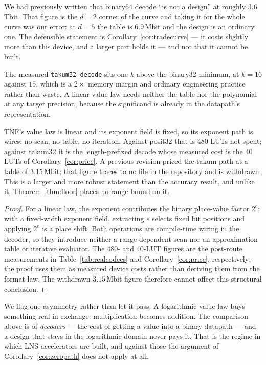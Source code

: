 We had previously written that binary64 decode ``is not a design'' at roughly
$3.6$\,Tbit. That figure is the $d = 2$ corner of the curve and taking it for the
whole curve was our error: at $d = 5$ the table is $6.9$\,Mbit and the design is an
ordinary one. The defensible statement is Corollary~\ref{cor:tradecurve} --- it
costs slightly more than this device, and a larger part holds it --- and not that it
cannot be built.

The measured \texttt{takum32\_decode} sits one $k$ above the binary32 minimum, at
$k = 16$ against $15$, which is a $2\times$ memory margin and ordinary engineering
practice rather than waste. A linear value law needs neither the table nor the
polynomial at any target precision, because the significand is already in the
datapath's representation.

\begin{corollary}
\label{cor:zeropath}
TNF's value law is linear and its exponent field is fixed, so its exponent path
is wires: no scan, no table, no iteration. Against posit32 that is $480$ LUTs not
spent; against takum32 it is the length-prefixed decode whose measured cost is the
$40$ LUTs of Corollary~\ref{cor:price}. A previous revision priced the takum path
at a table of $3.15$\,Mbit; that figure traces to no file in the repository and is
withdrawn. This is a
larger and more robust statement than the accuracy result, and unlike it,
Theorem~\ref{thm:floor} places no range bound on it.
\end{corollary}
\begin{proof}
For a linear law, the exponent contributes the binary place-value factor
$2^e$; with a fixed-width exponent field, extracting $e$ selects fixed bit
positions and applying $2^e$ is a place shift.  Both operations are
compile-time wiring in the decoder, so they introduce neither a
range-dependent scan nor an approximation table or iterative evaluator.
The $480$- and $40$-LUT figures are the post-route measurements in
Table~\ref{tab:realcodecs} and Corollary~\ref{cor:price}, respectively; the
proof uses them as measured device costs rather than deriving them from the
format law.  The withdrawn $3.15$\,Mbit figure therefore cannot affect this
structural conclusion.
\end{proof}

We flag one asymmetry rather than let it pass. A logarithmic value law buys
something real in exchange: multiplication becomes addition. The comparison above
is of \emph{decoders} --- the cost of getting a value into a binary datapath ---
and a design that stays in the logarithmic domain never pays it. That is the
regime in which LNS accelerators are built, and against those the argument of
Corollary~\ref{cor:zeropath} does not apply at all.



